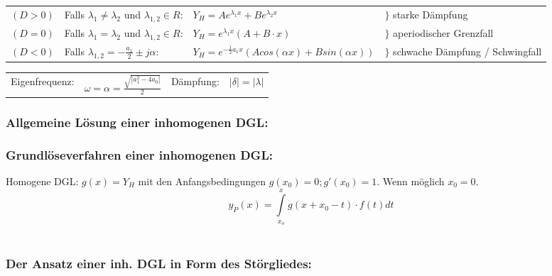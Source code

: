 \begin{tabular}{p{2cm}p{5cm}p{6cm}p{4cm}}
$(D > 0)$ &
Falls $\lambda_1\neq \lambda_2$ und $\lambda_{1,2} \in R$: &
$Y_H=Ae^{\lambda_1x}+Be^{\lambda_2x}$ & 
$\rbrace$ starke Dämpfung\\

$(D = 0)$ &
Falls $\lambda_1=\lambda_2$ und $\lambda_{1,2} \in R$: &
$Y_H=e^{\lambda_1x}(A+B\cdot x)$ & 
$\rbrace$ aperiodischer Grenzfall\\

$(D < 0)$ &
Falls $\lambda_{1,2}=-\frac{a_1}{2}\pm j\alpha$: &
$Y_H=e^{-\frac{1}{2}a_1x}(Acos(\alpha x) +Bsin(\alpha x))$ &
$\rbrace$ schwache Dämpfung / Schwingfall \\
\end{tabular}

\begin{tabular}{p{2cm}p{5cm}p{2cm}p{4cm}}
	Eigenfrequenz: & $\omega = \alpha = \frac{\sqrt{|a_1^2 - 4a_0|}}{2}$ &
	Dämpfung: &  $|\delta| = |\lambda|$\\
\end{tabular}

\subsubsection{Allgemeine Lösung einer inhomogenen DGL:\quad{}}

\subsubsection{Grundlöseverfahren einer inhomogenen DGL:\quad{}}
Homogene DGL: $g(x) = Y_H$ mit den Anfangsbedingungen $g(x_0) = 0; g'(x_0) = 1$. Wenn möglich $x_0 = 0$.\\
$$y_P(x)=\int\limits_{x_o}^{x} g(x+x_0-t)\cdot f(t)dt$$\\



\subsubsection{Der Ansatz einer inh. DGL in Form des Störgliedes:\quad{}}

